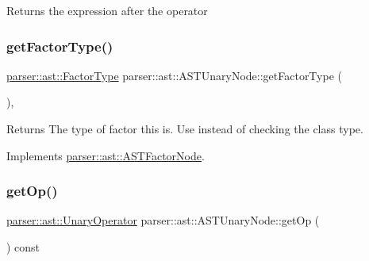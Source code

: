 \begin{DoxyReturn}{Returns}
the expression after the operator 
\end{DoxyReturn}
\mbox{\label{classparser_1_1ast_1_1ASTUnaryNode_a1056ebc5c34b6f3b0a5485f4cd5ba3c0}} 
\subsubsection{\texorpdfstring{get\+Factor\+Type()}{getFactorType()}}
{\footnotesize\ttfamily \hyperlink{ASTFactorNode_8h_afbe2fcc03ef15b74a0c1ed1cda7ab0e8}{parser\+::ast\+::\+Factor\+Type} parser\+::ast\+::\+A\+S\+T\+Unary\+Node\+::get\+Factor\+Type (\begin{DoxyParamCaption}{ }\end{DoxyParamCaption})\hspace{0.3cm}{\ttfamily [override]}, {\ttfamily [virtual]}}

\begin{DoxyReturn}{Returns}
The type of factor this is. Use instead of checking the class type. 
\end{DoxyReturn}


Implements \hyperlink{classparser_1_1ast_1_1ASTFactorNode_a13eea7f949c0055dea0a9d7b715f16a8}{parser\+::ast\+::\+A\+S\+T\+Factor\+Node}.

\mbox{\label{classparser_1_1ast_1_1ASTUnaryNode_a162e6f618c42d077d526decfde550a48}} 
\subsubsection{\texorpdfstring{get\+Op()}{getOp()}}
{\footnotesize\ttfamily \hyperlink{ASTUnaryNode_8h_a3bd5cd6c8af529b35a5e745ad51d5cdf}{parser\+::ast\+::\+Unary\+Operator} parser\+::ast\+::\+A\+S\+T\+Unary\+Node\+::get\+Op (\begin{DoxyParamCaption}{ }\end{DoxyParamCaption}) const}

